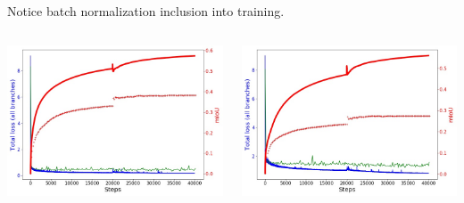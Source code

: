 \documentclass{beamer}
\begin{document}
\begin{frame}
\small{Notice batch normalization inclusion into training.}
\begin{columns}
\begin{center}
\includegraphics[scale=0.2]{icnet_res_1.jpg}
\end{center}
\begin{center}
\includegraphics[scale=0.2]{icnet_res_2.jpg}
\end{center}
\end{columns}

\end{frame}
\end{document}
